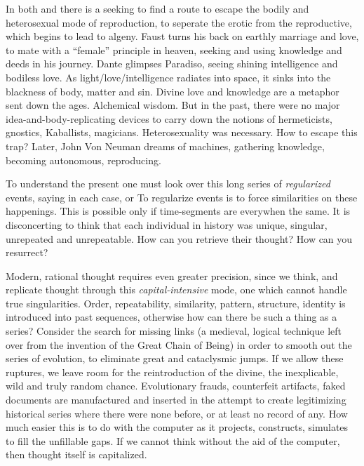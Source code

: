 In both  and  there is a seeking to find a route to escape the bodily and heterosexual mode of reproduction, to seperate the erotic from the reproductive, which begins to lead to algeny. Faust turns his back on earthly marriage and love, to mate with a \enquote{female} principle in heaven, seeking and using knowledge and deeds in his journey. Dante glimpses Paradiso, seeing shining intelligence and bodiless love. As light\slash love\slash intelligence radiates into space, it sinks into the blackness of body, matter and sin. Divine love and knowledge are a metaphor sent down the ages. Alchemical wisdom. But in the past, there were no major idea-and-body-replicating devices to carry down the notions of hermeticists, gnostics, Kaballists, magicians. Heterosexuality was necessary. How to escape this trap? Later, John Von Neuman dreams of machines, gathering knowledge, becoming autonomous, reproducing.

To understand the present one must look over this long series of \emph{regularized} events, saying in each case,  or  To regularize events is to force similarities on these happenings. This is possible only if time-segments are everywhen the same. It is disconcerting to think that each individual in history was unique, singular, unrepeated and unrepeatable. How can you retrieve their thought? How can you resurrect?

Modern, rational thought requires even greater precision, since we think, and replicate thought through this \emph{capital-intensive} mode, one which cannot handle true singularities. Order, repeatability, similarity, pattern, structure, identity is introduced into past sequences, otherwise how can there be such a thing as a series? Consider the search for missing links (a medieval, logical technique left over from the invention of the Great Chain of Being) in order to smooth out the series of evolution, to eliminate great and cataclysmic jumps. If we allow these ruptures, we leave room for the reintroduction of the divine, the inexplicable, wild and truly random chance. Evolutionary frauds, counterfeit artifacts, faked documents are manufactured and inserted in the attempt to create legitimizing historical series where there were none before, or at least no record of any. How much easier this is to do with the computer as it projects, constructs, simulates to fill the unfillable gaps. If we cannot think without the aid of the computer, then thought itself is capitalized.

